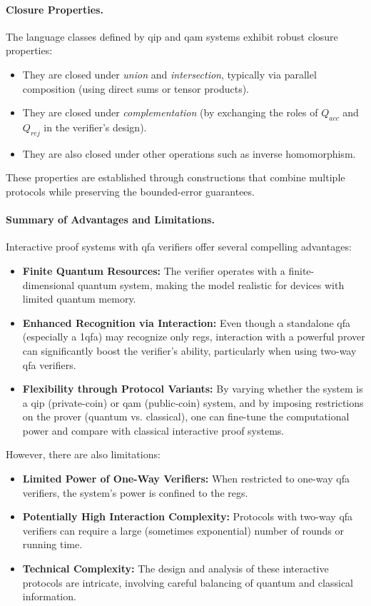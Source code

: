 \paragraph{Closure Properties.}
The language classes defined by \gls{qip} and \gls{qam} systems exhibit robust closure properties:
\begin{itemize}
  \item They are closed under \emph{union} and \emph{intersection}, typically via parallel composition (using direct sums or tensor products).
  \item They are closed under \emph{complementation} (by exchanging the roles of $Q_{acc}$ and $Q_{rej}$ in the verifier's design).
  \item They are also closed under other operations such as inverse homomorphism.
\end{itemize}
These properties are established through constructions that combine multiple protocols while preserving the bounded-error guarantees.

\paragraph{Summary of Advantages and Limitations.}
Interactive proof systems with qfa verifiers offer several compelling advantages:
\begin{itemize}
  \item \textbf{Finite Quantum Resources:} The verifier operates with a finite-dimensional quantum system, making the model realistic for devices with limited quantum memory.
  \item \textbf{Enhanced Recognition via Interaction:} Even though a standalone qfa (especially a 1qfa) may recognize only \glspl{reg}, interaction with a powerful prover can significantly boost the verifier's ability, particularly when using two-way qfa verifiers.
  \item \textbf{Flexibility through Protocol Variants:} By varying whether the system is a \gls{qip} (private-coin) or \gls{qam} (public-coin) system, and by imposing restrictions on the prover (quantum vs. classical), one can fine-tune the computational power and compare with classical interactive proof systems.
\end{itemize}
However, there are also limitations:
\begin{itemize}
  \item \textbf{Limited Power of One-Way Verifiers:} When restricted to one-way qfa verifiers, the system's power is confined to the \glspl{reg}.
  \item \textbf{Potentially High Interaction Complexity:} Protocols with two-way qfa verifiers can require a large (sometimes exponential) number of rounds or running time.
  \item \textbf{Technical Complexity:} The design and analysis of these interactive protocols are intricate, involving careful balancing of quantum and classical information.
\end{itemize}

